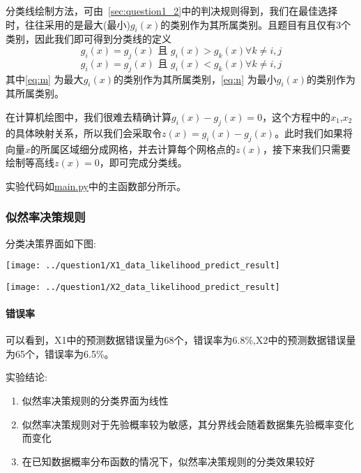 \documentclass[UTF8]{article} %
\begin{document}
    分类线绘制方法，可由~\ref{sec:question1_2}中的判决规则得到，我们在最佳选择时，往往采用的是最大(最小)$g_i(x)$的类别作为其所属类别。且题目有且仅有3个类别，因此我们即可得到分类线的定义
    \begin{equation}
        g_i(x) = g_j(x) \text{ 且 } g_i(x) > g_k(x) \forall k \neq i,j \label{eq:m}
    \end{equation}
    \begin{equation}
        g_i(x) = g_j(x) \text{ 且 } g_i(x) < g_k(x) \forall k \neq i,j \label{eq:n}
    \end{equation}
    其中\eqref{eq:m} 为最大$g_i(x)$的类别作为其所属类别，\eqref{eq:n} 为最小$g_i(x)$的类别作为其所属类别。

    在计算机绘图中，我们很难去精确计算$g_i(x) - g_j(x) = 0$，这个方程中的$x_1$,$x_2$的具体映射关系，所以我们会采取令$z(x) = g_i(x) - g_j(x)$。此时我们如果将向量$x$的所属区域细分成网格，并去计算每个网格点的$z(x)$，接下来我们只需要绘制等高线$z(x) = 0$，即可完成分类线。

    实验代码如\href{run:main.py}{main.py}中的主函数部分所示。

    \subsubsection{似然率决策规则}

    分类决策界面如下图:

    \begin{minipage}[t]{0.5\linewidth}
        \centering
        \texttt{[image: ../question1/X1\_data\_likelihood\_predict\_result]}
        \label{fig:likelihood1} %
    \end{minipage}%
    \begin{minipage}[t]{0.5\linewidth}
        \centering
        \texttt{[image: ../question1/X2\_data\_likelihood\_predict\_result]}
        \label{fig:likelihood2} %
    \end{minipage}
    \paragraph{错误率}

    可以看到，X1中的预测数据错误量为68个，错误率为6.8\%,X2中的预测数据错误量为65个，错误率为6.5\%。

    实验结论:
    \begin{enumerate}
        \item 似然率决策规则的分类界面为线性
        \item 似然率决策规则对于先验概率较为敏感，其分界线会随着数据集先验概率变化而变化
        \item 在已知数据概率分布函数的情况下，似然率决策规则的分类效果较好
    \end{enumerate}
\end{document}
